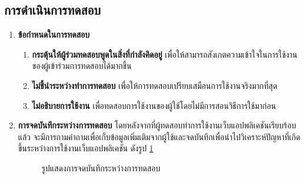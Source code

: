 \subsection{การดำเนินการทดสอบ}
\begin{enumerate}
    \item \textbf{ข้อกำหนดในการทดสอบ}
          \begin{enumerate}
              \item \textbf{กระตุ้นให้ผู้ร่วมทดสอบพูดในสิ่งที่กำลังคิดอยู่} เพื่อให้สามารถสังเกตความเข้าใจในการใช้งานของผู้เข้าร่วมการทดสอบได้มากขึ้น
              \item \textbf{ไม่ชี้นำระหว่างทำการทดสอบ} เพื่อให้การทดสอบเปรียบเสมือนการใช้งานจริงมากที่สุด
              \item \textbf{ไม่อธิบายการใช้งาน} เพื่อทดสอบการใช้งานของผู้ใช้โดยไม่มีการสอนวิธีการใช้มาก่อน
          \end{enumerate}
    \item \textbf{การจดบันทึกระหว่างการทดสอบ} โดยหลังจากที่ผู้ทดสอบทำการใช้งานเว็บแอปพลิเคชันเรียบร้อบแล้ว จะมีการถามคำถามเพื่อเก็บข้อมูลเพิ่มเติมจากผู้ใช้และจดบันทึกเพื่อนำไปวิเคราะห์ปัญหาที่เกิดขึ้นระหว่างการใช้งานเว็บแอปพลิเคชัน ดังรูป \ref{fig:NoteTaking}
          \begin{figure}[H]\centering
              \caption{รูปแสดงการจดบันทึกระหว่างการทดสอบ}\label{fig:NoteTaking}
          \end{figure}
\end{enumerate}
